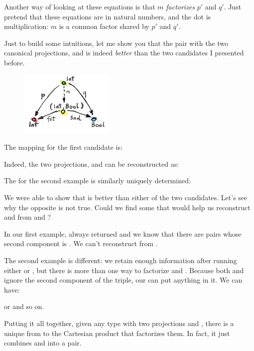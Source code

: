 \noindent
Another way of looking at these equations is that $m$
\emph{factorizes} $p'$ and $q'$. Just pretend that these
equations are in natural numbers, and the dot is multiplication:
$m$ is a common factor shared by $p'$ and $q'$.

Just to build some intuitions, let me show you that the pair
 with the two canonical projections, 
and  is indeed \emph{better} than the two candidates I
presented before.

\begin{figure}[H]
\centering
\includegraphics[width=0.4\textwidth]{images/not-a-product.jpg}
\end{figure}

\noindent
The mapping  for the first candidate is:

Indeed, the two projections,  and  can be
reconstructed as:

The  for the second example is similarly uniquely determined:

We were able to show that  is better than either of
the two candidates. Let's see why the opposite is not true. Could we
find some  that would help us reconstruct 
and  from  and ?

In our first example,  always returned  and we
know that there are pairs whose second component is . We
can't reconstruct  from .

The second example is different: we retain enough information after
running either  or , but there is more than one way
to factorize  and . Because both  and
 ignore the second component of the triple, our 
can put anything in it. We can have:


or
and so on.

Putting it all together, given any type  with two projections
 and , there is a unique  from 
to the Cartesian product  that factorizes them. In fact,
it just combines  and  into a pair.

